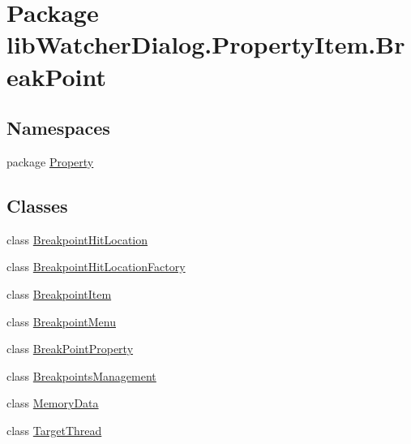 \hypertarget{namespacelib_watcher_dialog_1_1_property_item_1_1_break_point}{\section{Package lib\+Watcher\+Dialog.\+Property\+Item.\+Break\+Point}
\label{namespacelib_watcher_dialog_1_1_property_item_1_1_break_point}
}
\subsection*{Namespaces}
\begin{DoxyCompactItemize}
\item 
package \hyperlink{namespacelib_watcher_dialog_1_1_property_item_1_1_break_point_1_1_property}{Property}
\end{DoxyCompactItemize}
\subsection*{Classes}
\begin{DoxyCompactItemize}
\item 
class \hyperlink{classlib_watcher_dialog_1_1_property_item_1_1_break_point_1_1_breakpoint_hit_location}{Breakpoint\+Hit\+Location}
\item 
class \hyperlink{classlib_watcher_dialog_1_1_property_item_1_1_break_point_1_1_breakpoint_hit_location_factory}{Breakpoint\+Hit\+Location\+Factory}
\item 
class \hyperlink{classlib_watcher_dialog_1_1_property_item_1_1_break_point_1_1_breakpoint_item}{Breakpoint\+Item}
\item 
class \hyperlink{classlib_watcher_dialog_1_1_property_item_1_1_break_point_1_1_breakpoint_menu}{Breakpoint\+Menu}
\item 
class \hyperlink{classlib_watcher_dialog_1_1_property_item_1_1_break_point_1_1_break_point_property}{Break\+Point\+Property}
\item 
class \hyperlink{classlib_watcher_dialog_1_1_property_item_1_1_break_point_1_1_breakpoints_management}{Breakpoints\+Management}
\item 
class \hyperlink{classlib_watcher_dialog_1_1_property_item_1_1_break_point_1_1_memory_data}{Memory\+Data}
\item 
class \hyperlink{classlib_watcher_dialog_1_1_property_item_1_1_break_point_1_1_target_thread}{Target\+Thread}
\end{DoxyCompactItemize}
